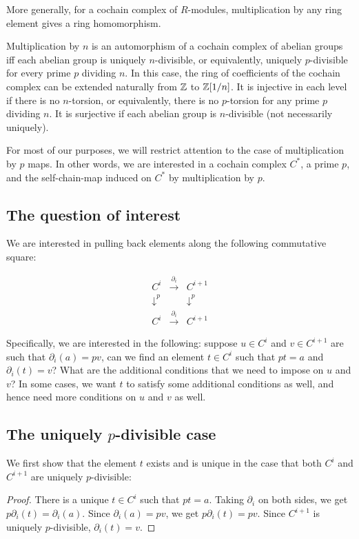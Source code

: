 \documentclass[10pt]{amsart}
\begin{document}
More generally, for a cochain complex of $R$-modules, multiplication
by any ring element gives a ring homomorphism.

Multiplication by $n$ is an automorphism of a cochain complex of
abelian groups iff each abelian group is uniquely $n$-divisible, or
equivalently, uniquely $p$-divisible for every prime $p$ dividing
$n$. In this case, the ring of coefficients of the cochain complex can
be extended naturally from $\mathbb{Z}$ to $\mathbb{Z}[1/n]$. It is injective in each
level if there is no $n$-torsion, or equivalently, there is no
$p$-torsion for any prime $p$ dividing $n$. It is surjective if each
abelian group is $n$-divisible (not necessarily uniquely).

For most of our purposes, we will restrict attention to the case of
multiplication by $p$ maps. In other words, we are interested in a
cochain complex $C^*$, a prime $p$, and the self-chain-map induced on
$C^*$ by multiplication by $p$.

\subsection{The question of interest}

We are interested in pulling back elements along the following
commutative square:

\begin{eqnarray*}
  C^i & \stackrel{\partial_i}{\to} &C^{i+1}\\
  \downarrow^{p} & & \downarrow^{p}\\
  C^i & \stackrel{\partial_i}{\to} &C^{i+1}
\end{eqnarray*}

Specifically, we are interested in the following: suppose $u \in C^i$
and $v \in C^{i+1}$ are such that $\partial_i(a) = pv$, can we find an
element $t \in C^i$ such that $pt = a$ and $\partial_i(t) = v$? What
are the additional conditions that we need to impose on $u$ and $v$?
In some cases, we want $t$ to satisfy some additional conditions as
well, and hence need more conditions on $u$ and $v$ as well.

\subsection{The uniquely $p$-divisible case}

We first show that the element $t$ exists and is unique in the case
that both $C^i$ and $C^{i+1}$ are uniquely $p$-divisible:

\begin{proof}
  There is a unique $t \in C^i$ such that $pt = a$. Taking
  $\partial_i$ on both sides, we get $p\partial_i(t) =
  \partial_i(a)$. Since $\partial_i(a) = pv$, we get $p\partial_i(t) =
  pv$. Since $C^{i+1}$ is uniquely $p$-divisible, $\partial_i(t) = v$.
\end{proof}
\end{document}
